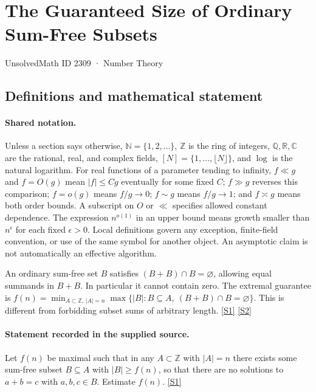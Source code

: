 \documentclass[11pt,a4paper]{article}
\newcommand{\N}{\mathbb{N}}
\newcommand{\Z}{\mathbb{Z}}
\newcommand{\Q}{\mathbb{Q}}
\newcommand{\R}{\mathbb{R}}
\newcommand{\C}{\mathbb{C}}
\newcommand{\sref}[2]{\hyperlink{source:#1:#2}{[S#2]}}
\begin{document}

\setcounter{section}{2308}

\section{The Guaranteed Size of Ordinary Sum-Free Subsets}\label{2309}

{\small\sffamily UnsolvedMath ID 2309 · Number Theory}

\subsection{Definitions and mathematical statement}

\paragraph{Shared notation.}Unless a section says otherwise, $\N=\{1,2,\ldots\}$,
$\Z$ is the ring of integers, $\Q,\R,\C$ are the rational, real, and complex
fields, $[N]=\{1,\ldots,\lfloor N\rfloor\}$, and $\log$ is the natural
logarithm. For real functions of a parameter tending to infinity,
$f\ll g$ and $f=O(g)$ mean $|f|\leq Cg$ eventually for some fixed $C$;
$f\gg g$ reverses this comparison; $f=o(g)$ means $f/g\to0$;
$f\sim g$ means $f/g\to1$; and $f\asymp g$ means both order bounds.
A subscript on $O$ or $\ll$ specifies allowed constant dependence.
The expression $n^{o(1)}$ in an upper bound means growth smaller than
$n^\epsilon$ for each fixed $\epsilon>0$. Local definitions govern any
exception, finite-field convention, or use of the same symbol for another
object. An asymptotic claim is not automatically an effective algorithm.



An ordinary sum-free set $B$ satisfies $(B+B)\cap B=\varnothing$, allowing equal summands in $B+B$. In particular it cannot contain zero. The extremal guarantee is $f(n)=\min_{A\subset\Z,\,|A|=n}\max\{|B|:B\subseteq A,\ (B+B)\cap B=\varnothing\}$. This is different from forbidding subset sums of arbitrary length. \sref{2309}{1} \sref{2309}{2}

\paragraph{Statement recorded in the supplied source.}
Let $f(n)$ be maximal such that in any $A\subset \mathbb{Z}$ with $\lvert A\rvert=n$ there exists some sum-free subset $B\subseteq A$ with $\lvert B\rvert \geq f(n)$, so that there are no solutions to $ a+b=c $ with $a,b,c\in B$. Estimate $f(n)$. \sref{2309}{1}
\end{document}
